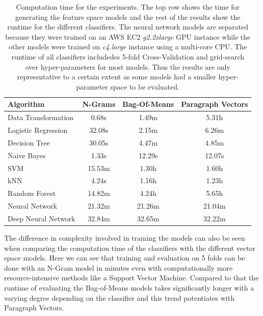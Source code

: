 \begin{table}[h]
  \begin{center}
    \begin{tabular}{ l c c c }
      \toprule
      Algorithm & N-Grams & Bag-Of-Means & Paragraph Vectors \\
      \midrule
      Data Transformation & 0.68s & 1.49m & 5.31h \\
      \midrule
      Logistic Regression & 32.08s & 2.15m & 6.26m \\
      Decision Tree & 30.05s & 4.47m & 4.85m \\
      Naive Bayes & 1.33s & 12.29s & 12.07s \\
      SVM & 15.53m & 1.30h & 1.60h \\
      kNN & 4.24s & 1.16h & 1.23h \\
      Random Forest & 14.82m & 4.24h & 5.65h \\
      \midrule
      Neural Network & 21.32m & 21.26m & 21.04m \\
      Deep Neural Network & 32.84m & 32.65m & 32.22m \\
      \bottomrule
    \end{tabular}
  \caption{Computation time for the experiments. The top row shows the time for generating the feature space models and the rest of the results show the runtime for the different classifiers. The neural network models are separated because they were trained on an \gls{AWS} EC2 \emph{g2.2xlarge} \gls{GPU} instance while the other models were trained on \emph{c4.large} instance using a multi-core CPU. The runtime of all classifiers includedes 5-fold \gls{Cross-Validation} and grid-search over hyper-parameters for most models. Thus the results are only representative to a certain extent as some models had a smaller hyper-parameter space to be evaluated.}
\label{tab:Computation time}
\end{center}
\end{table}

The difference in complexity involved in training the models can also be seen when comparing the computation time of the classifiers with the different vector space models. Here we can see that training and evaluation on 5 folds can be done with an N-Gram model in minutes even with computationally more resource-intensive methods like a Support Vector Machine. Compared to that the runtime of evaluating the Bag-of-Means models takes significantly longer with a varying degree depending on the classifier and this trend potentiates with Paragraph Vectors.

